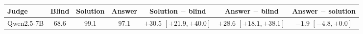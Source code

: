 \begin{tabular}{lcccccc}
\toprule
Judge & Blind & Solution & Answer & Solution $-$ blind & Answer $-$ blind & Answer $-$ solution \\
\midrule
Qwen2.5-7B & 68.6 & 99.1 & 97.1 & $+30.5$ {\scriptsize$[+21.9,+40.0]$} & $+28.6$ {\scriptsize$[+18.1,+38.1]$} & $-1.9$ {\scriptsize$[-4.8,+0.0]$} \\
\bottomrule
\end{tabular}
